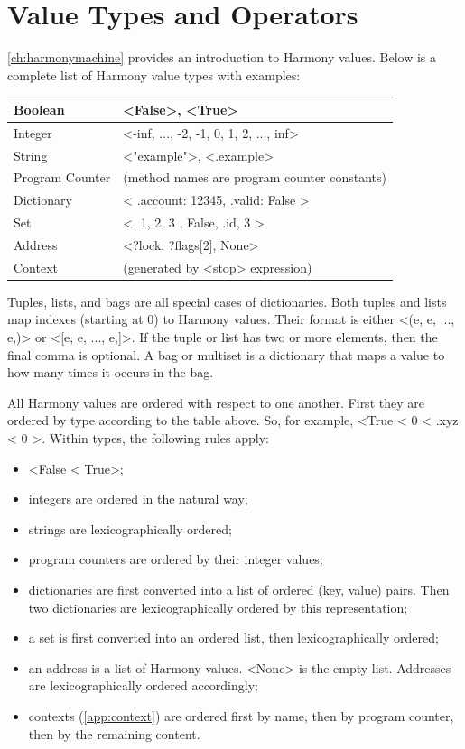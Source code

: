 \documentclass{report}
\begin{document}
{\section{Value Types and Operators}
\label{ap:values}

\autoref{ch:harmonymachine} provides an introduction to Harmony values.
Below is a complete list of Harmony value types with examples:

\vspace{1em}
\begin{tabular}{|l|l|}
\hline
Boolean & <{False}>, <{True}> \\
\hline
Integer & <{-inf, ..., -2, -1, 0, 1, 2, ..., inf}> \\
\hline
String & <{"example"}>, <{.example}> \\
\hline
Program Counter & (method names are program counter constants) \\
\hline
Dictionary & <{{ .account: 12345, .valid: False }}> \\
\hline
Set & <{{}, { 1, 2, 3 }, { False, .id, 3 }}> \\
\hline
Address & <{?lock, ?flags[2], None}> \\
\hline
Context & (generated by <{stop}> expression) \\
\hline
\end{tabular}
\vspace{1em}

Tuples, lists, and bags are all special cases of dictionaries.
Both tuples and lists map indexes (starting at 0) to Harmony values.
Their format is either <{(e, e, ..., e,)}> or <{[e, e, ..., e,]}>.
If the tuple or list has two or more elements, then the final comma
is optional.
A bag or multiset is a dictionary that maps a value to how many
times it occurs in the bag.

All Harmony values are ordered with respect to one another.  First they
are ordered by type according to the table above.
So, for example, <{True < 0 < .xyz < { 0 }}>.
Within types, the following rules apply:

\begin{itemize}
\item <{False < True}>;
\item integers are ordered in the natural way;
\item strings are lexicographically ordered;
\item program counters are ordered by their integer values;
\item dictionaries are first converted into a list of ordered (key, value)
pairs.  Then two dictionaries are lexicographically ordered by this
representation;
\item a set is first converted into an ordered list, then lexicographically
ordered;
\item an address is a list of Harmony values.  <{None}> is the empty list.
Addresses are lexicographically ordered accordingly;
\item contexts (\autoref{app:context}) are ordered first by name, then by program counter, then by the remaining content.
\end{itemize}

}
\end{document}

